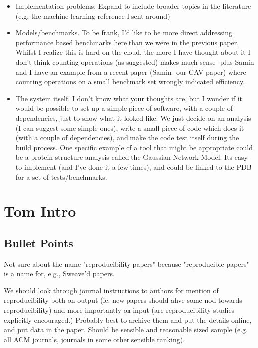 \documentclass[a4paper,11pt]{article}
\begin{document}
 \begin{itemize}
\item Implementation problems. Expand to include broader topics in the
literature (e.g. the machine learning reference I sent around)

\item Models/benchmarks. To be frank, I'd like to be more direct
addressing performance based benchmarks here than we were in the
previous paper. Whilst I realize this is hard on the cloud, the more I
have thought about it I don't think counting operations (as suggested)
makes much sense- plus Samin and I have an example from a recent paper
(Samin- our CAV paper) where counting operations on a small benchmark
set wrongly indicated efficiency.

\item The system itself. I don't know what your thoughts are, but I
wonder if it would be possible to set up a simple piece of software,
with a couple of dependencies, just to show what it looked like. We
just decide on an analysis (I can suggest some simple ones), write a
small piece of code which does it (with a couple of dependencies), and
make the code test itself during the build process. One specific
example of a tool that might be appropriate could be a protein
structure analysis called the Gaussian Network Model. Its easy to
implement (and I've done it a few times), and could be linked to the
PDB for a set of tests/benchmarks.
\end{itemize}



\section{Tom Intro}

\subsection{Bullet Points}
Not sure about the name "reproducibility papers" because "reproducible
papers" is a name for, e.g., Sweave'd papers.

We should look through journal instructions to authors for mention of
reproducibility both on output (ie. new papers should ahve some nod
towards reproducibility) and more importantly on input (are
reproducibility studies explicitly encouraged.)  Probably best to
archive them and put the details online, and put data in the
paper. Should be sensible and reasonable sized sample (e.g. all ACM
journals, journals in some other sensible ranking).
\end{document}
